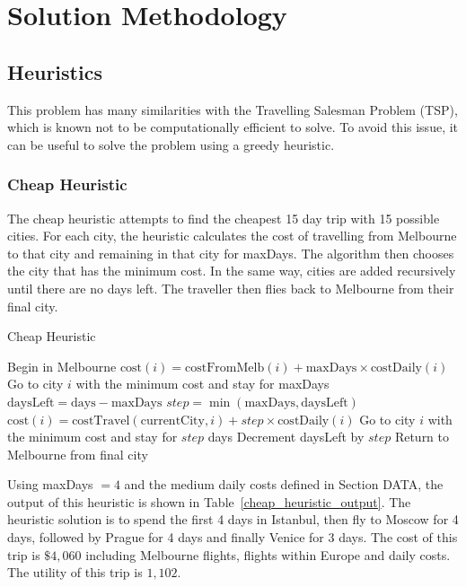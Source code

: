 \documentclass[12pt]{article}
\begin{document}
\section{Solution Methodology} 
\label{sec:methods}


\subsection{Heuristics}

This problem has many similarities with the Travelling Salesman Problem (TSP), which is known not to be computationally efficient to solve. To avoid this issue, it can be useful to solve the problem using a greedy heuristic.

\subsubsection{Cheap Heuristic}

The cheap heuristic attempts to find the cheapest 15 day trip with 15 possible cities. For each city, the heuristic calculates the cost of travelling from Melbourne to that city and remaining in that city for maxDays. The algorithm then chooses the city that has the minimum cost. In the same way, cities are added recursively until there are no days left. The traveller then flies back to Melbourne from their final city.

\begin{algorithm}[ht!]
\caption{Cheap Heuristic}
\begin{algorithmic}
\STATE Begin in Melbourne
\STATE $\text{cost}(i) = \text{costFromMelb}(i) + \text{maxDays} \times \text{costDaily}(i)$
\ENDFOR
\STATE Go to city $i$ with the minimum cost and stay for maxDays
\STATE $\text{daysLeft} = \text{days} - \text{maxDays}$
\STATE $step = \min (\text{maxDays}, \text{daysLeft})$
\STATE $\text{cost}(i) = \text{costTravel}(\text{currentCity}, i) + step \times \text{costDaily}(i)$
\ENDFOR
\STATE Go to city $i$ with the minimum cost and stay for $step$ days
\STATE Decrement daysLeft by $step$
\ENDWHILE
\STATE Return to Melbourne from final city
\end{algorithmic}
\end{algorithm}

Using maxDays $= 4$ and the medium daily costs defined in Section DATA, the output of this heuristic is shown in Table~\ref{cheap_heuristic_output}. The heuristic solution is to spend the first 4 days in Istanbul, then fly to Moscow for 4 days, followed by Prague for 4 days and finally Venice for 3 days. The cost of this trip is $\$4,060$ including Melbourne flights, flights within Europe and daily costs. The utility of this trip is $1,102$.
\end{document}
